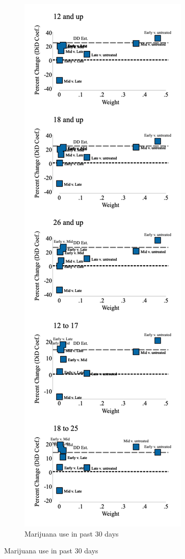 \documentclass[12pt]{article}%
\begin{document}
\begin{appendices}
\begin{figure}
\begin{minipage}{.9\linewidth}
\begin{subfigure}[b]{0.32\columnwidth}
  \end{subfigure}
  \hfill %
  \begin{subfigure}[b]{0.32\columnwidth}
      \caption{\scriptsize{Marijuana use in past 30 days}}
    \includegraphics[width=\linewidth]{../output/plots/bacon_weights_ln_mj_use_30.png}

\end{subfigure}
\end{minipage}
\end{figure}
\end{appendices}
\end{document}
